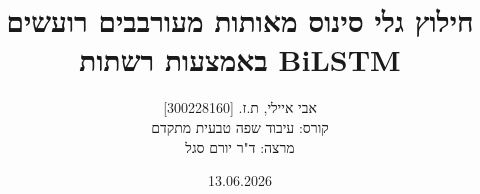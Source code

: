 \title{חילוץ גלי סינוס מאותות מעורבבים רועשים באמצעות רשתות \textenglish{BiLSTM}}
\author{אבי איילי, ת.ז. [\textenglish{300228160}] \\ קורס: עיבוד שפה טבעית מתקדם \\ מרצה: ד"ר יורם סגל}
\date{\textenglish{13.06.2026}}
